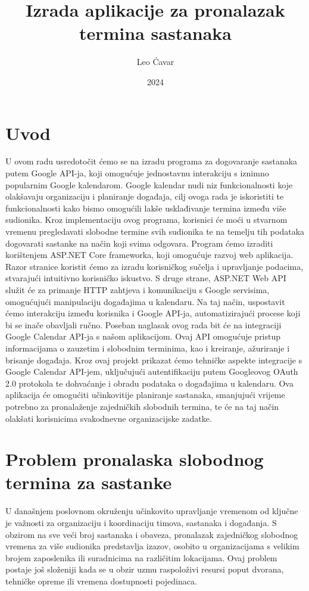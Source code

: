 \documentclass{foi}
\title{Izrada aplikacije za pronalazak termina sastanaka}
\author{Leo Ćavar}
\date{2024}
\begin{document}
\maketitle

\tableofcontents

\pagestyle{plain}
\chapter{Uvod}
U ovom radu usredotočit ćemo se na izradu programa za dogovaranje sastanaka putem Google API-ja, koji omogućuje jednostavnu interakciju s iznimno popularnim Google kalendarom. Google kalendar nudi niz funkcionalnosti koje olakšavaju organizaciju i planiranje događaja, cilj ovoga rada je iskoristiti te funkcionalnosti kako bismo omogućili lakše usklađivanje termina između više sudionika. Kroz implementaciju ovog programa, korisnici će moći u stvarnom vremenu pregledavati slobodne termine svih sudionika te na temelju tih podataka dogovarati sastanke na način koji svima odgovara. Program ćemo izraditi korištenjem ASP.NET Core frameworka, koji omogućuje razvoj web aplikacija. Razor stranice koristit ćemo za izradu korisničkog sučelja i upravljanje podacima, stvarajući intuitivno korisničko iskustvo. S druge strane, ASP.NET Web API služit će za primanje HTTP zahtjeva i komunikaciju s Google servisima, omogućujući manipulaciju događajima u kalendaru. Na taj način, uspostavit ćemo interakciju između korisnika i Google API-ja, automatizirajući procese koji bi se inače obavljali ručno. Poseban naglasak ovog rada bit će na integraciji Google Calendar API-ja s našom aplikacijom. Ovaj API omogućuje pristup informacijama o zauzetim i slobodnim terminima, kao i kreiranje, ažuriranje i brisanje događaja.
Kroz ovaj projekt prikazat ćemo tehničke aspekte integracije s Google Calendar API-jem, uključujući autentifikaciju putem Googleovog OAuth 2.0 protokola te dohvaćanje i obradu podataka o događajima u kalendaru.
Ova aplikacija će omogućiti učinkovitije planiranje sastanaka, smanjujući vrijeme potrebno za pronalaženje zajedničkih slobodnih termina, te će na taj način olakšati korisnicima svakodnevne organizacijske zadatke.
\chapter{Problem pronalaska slobodnog termina za sastanke}

U današnjem poslovnom okruženju učinkovito upravljanje vremenom od ključne je važnosti za organizaciju i koordinaciju timova, sastanaka i događanja. S obzirom na sve veći broj sastanaka i obaveza, pronalazak zajedničkog slobodnog vremena za više sudionika predstavlja izazov, osobito u organizacijama s velikim brojem zaposlenika ili suradnicima na različitim lokacijama. Ovaj problem postaje još složeniji kada se u obzir uzmu raspoloživi resursi poput dvorana, tehničke opreme ili vremena dostupnosti pojedinaca.
\end{document}
